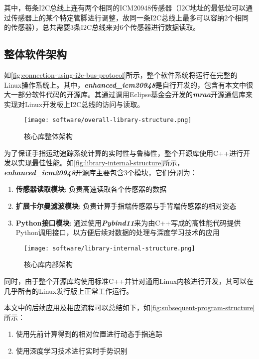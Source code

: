 其中，每条I2C总线上连有两个相同的ICM20948传感器（I2C地址的最低位可以通过传感器上的某个特定管脚进行调整，故同一条I2C总线上最多可以容纳2个相同的传感器），总共需要3条I2C总线来对6个传感器进行数据读取。

\subsection{整体软件架构}

如\autoref{fig:connection-using-i2c-bus-protocol}所示，整个软件系统将运行在完整的Linux操作系统上。其中，{\bfseries \itshape enhanced\_icm20948}是自行开发的，包含有本文中很大一部分软件代码的开源库。其通过调用Eclipse基金会开发的{\bfseries \itshape mraa}开源通信库来实现对Linux开发板上I2C总线的访问与读取。

\begin{figure}[H]
    \centering
    \texttt{[image: software/overall-library-structure.png]}
    \caption{\label{fig:overall-library-structure}核心库整体架构}
\end{figure}

为了保证手指运动追踪系统计算的实时性与鲁棒性，整个开源库使用C++进行开发以实现最佳性能。如\autoref{fig:library-internal-structure}所示，{\bfseries \itshape enhanced\_icm20948}开源库主要包含3个模块，它们分别为：
\begin{enumerate}[label=(\alph*)]
    \item {\bfseries 传感器读取模块}: 负责高速读取各个传感器的数据
    \item {\bfseries 扩展卡尔曼滤波模块}: 负责计算手指端传感器与手背端传感器的相对姿态
    \item {\bfseries Python接口模块}: 通过使用{\bfseries \itshape Pybind11}来为由C++写成的高性能代码提供Python调用接口，以方便后续对数据的处理与深度学习技术的应用
\end{enumerate}

\begin{figure}[H]
    \centering
    \texttt{[image: software/library-internal-structure.png]}
    \caption{\label{fig:library-internal-structure}核心库内部架构}
\end{figure}

同时，由于整个开源库均使用标准C++并针对通用Linux内核进行开发，其可以在几乎所有的Linux发行版上正常工作运行。

本文中的后续应用及相应流程可以总结如下，如\autoref{fig:subsequent-program-structure}所示：
\begin{enumerate}[label=(\alph*)]
    \item 使用先前计算得到的相对位置进行动态手指追踪
    \item 使用深度学习技术进行实时手势识别
\end{enumerate}

